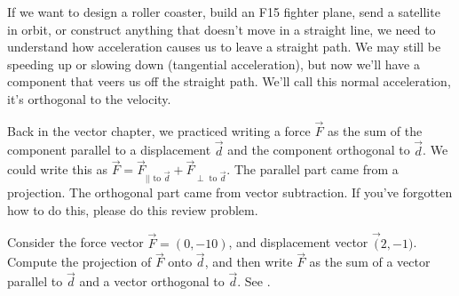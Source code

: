 If we want to design a roller coaster, build an F15 fighter plane, send a satellite in orbit, or construct anything that doesn't move in a straight line, we need to understand how acceleration causes us to leave a straight path. We may still be speeding up or slowing down (tangential acceleration), but now we'll have a component that veers us off the straight path.  We'll call this normal acceleration, it's orthogonal to the velocity. 

Back in the vector chapter, we practiced writing a force $\vec F$ as the sum of the component parallel to a displacement $\vec d$ and the component orthogonal to $\vec d$.  We could write this as $\vec F = \vec F_{|| \text{ to }\vec d} + \vec F_{\perp \text{ to }\vec d}.$ The parallel part came from a projection.  The orthogonal part came from vector subtraction.  If you've forgotten how to do this, please do this review problem.

\begin{review*}
 Consider the force vector $\vec F = (0,-10)$, and displacement vector $\vec (2,-1)$.  Compute the projection of $\vec F$ onto $\vec d$, and then write $\vec F$ as the sum of a vector parallel to $\vec d$ and a vector orthogonal to $\vec d$. See . 
\end{review*}



